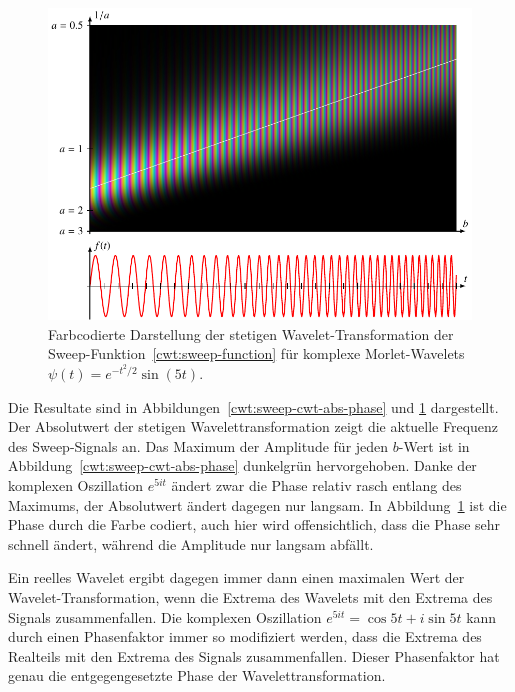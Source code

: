 \begin{beispiel}
\begin{figure}
\includegraphics[width=\hsize]{chapters/4-cwt/images/sweep.pdf}
\caption{Farbcodierte Darstellung der stetigen Wavelet-Transformation
der Sweep-Funktion~\eqref{cwt:sweep-function}
für komplexe Morlet-Wavelets $\psi(t) = e^{-t^2/2} \sin(5t)$.
\label{cwt:sweep-cwt-color}}
\end{figure}
Die Resultate sind in Abbildungen~\ref{cwt:sweep-cwt-abs-phase} und
\ref{cwt:sweep-cwt-color} dargestellt.
Der Absolutwert der stetigen Wavelettransformation zeigt die aktuelle
Frequenz des Sweep-Signals an.
Das Maximum der Amplitude für jeden $b$-Wert ist in
Abbildung~\ref{cwt:sweep-cwt-abs-phase} dunkelgrün hervorgehoben.
Danke der komplexen Oszillation $e^{5it}$ ändert zwar die Phase relativ
rasch entlang des Maximums, der Absolutwert ändert dagegen nur 
langsam.
In Abbildung~\ref{cwt:sweep-cwt-color} ist die Phase durch die Farbe
codiert, auch hier wird offensichtlich, dass die Phase sehr schnell ändert,
während die Amplitude nur langsam abfällt.

Ein reelles Wavelet ergibt dagegen immer dann einen maximalen Wert der
Wavelet-Transformation, wenn die Extrema des Wavelets mit den Extrema
des Signals zusammenfallen.
Die komplexen Oszillation $e^{5it}=\cos 5t + i\sin 5t$ kann durch einen
Phasenfaktor immer so modifiziert werden, dass die Extrema des Realteils
mit den Extrema des Signals zusammenfallen.
Dieser Phasenfaktor hat genau die entgegengesetzte Phase der
Wavelettransformation.
\end{beispiel}
